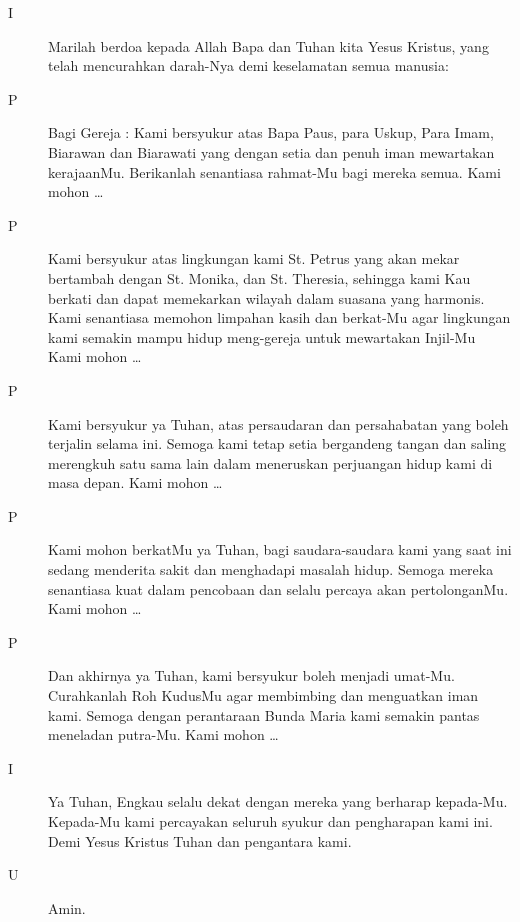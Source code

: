 \documentclass[12pt,a4paper]{article}
\begin{document}
\begin{description}

\item [I] Marilah berdoa kepada Allah Bapa dan Tuhan kita Yesus Kristus, yang telah mencurahkan darah-Nya demi keselamatan semua manusia:
\item [P] Bagi Gereja : Kami bersyukur atas Bapa Paus, para Uskup, Para Imam, Biarawan dan Biarawati yang dengan setia dan penuh iman mewartakan kerajaanMu. Berikanlah senantiasa rahmat-Mu  bagi mereka semua. Kami mohon \ldots

\item [P]	Kami bersyukur atas lingkungan kami St. Petrus yang akan mekar bertambah dengan St. Monika, dan St. Theresia, sehingga kami Kau berkati dan dapat memekarkan wilayah dalam suasana yang harmonis. Kami senantiasa memohon limpahan kasih dan berkat-Mu agar lingkungan kami semakin mampu hidup meng-gereja untuk mewartakan Injil-Mu  Kami mohon \ldots

\item [P]	Kami bersyukur ya Tuhan, atas persaudaran dan persahabatan yang boleh terjalin selama  ini. Semoga kami tetap setia bergandeng tangan dan saling merengkuh satu sama lain dalam meneruskan perjuangan hidup kami di masa depan. Kami mohon \dots

\item [P]  Kami mohon berkatMu ya Tuhan, bagi saudara-saudara kami yang saat ini sedang menderita sakit dan menghadapi masalah hidup. Semoga mereka senantiasa kuat dalam pencobaan dan selalu percaya akan pertolonganMu. Kami mohon \dots
\item [P]	Dan akhirnya ya Tuhan, kami bersyukur boleh menjadi umat-Mu. Curahkanlah Roh KudusMu agar membimbing dan menguatkan iman kami. Semoga dengan perantaraan Bunda Maria kami semakin pantas meneladan putra-Mu. Kami mohon \ldots
\item [I] 	Ya Tuhan, Engkau selalu dekat dengan mereka yang berharap kepada-Mu. Kepada-Mu kami percayakan seluruh syukur dan pengharapan kami ini. Demi Yesus Kristus Tuhan dan pengantara kami.
\item [U]	Amin.
\end{description}
\end{document}
